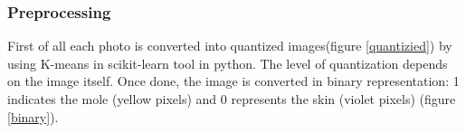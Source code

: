 \documentclass[a4paper,12pt,oneside,titlepage]{article}
\begin{document}
	\subsubsection{Preprocessing}
	First of all each photo is converted into quantized images(figure \ref{quantizied}) by using K-means in scikit-learn tool in python. The level of quantization depends on the image itself. Once done, the image is converted in binary representation: 1 indicates the mole (yellow pixels) and 0 represents the skin (violet pixels) (figure \ref{binary}).
	\begin{figure}[H]
		\centering
		\hfill

\end{figure}
\end{document}
